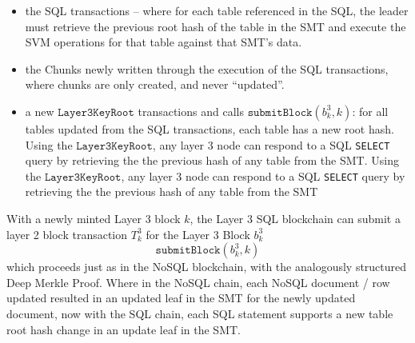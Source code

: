 \documentclass{article}
\newcommand{\blockhash}[2]{b^{#1}_{#2}}
\newcommand{\transaction}[2]{T_{#2}^#1}
\newcommand{\submitblock}[2]{\texttt{submitBlock}(#2, #1)}
\newcommand{\sql}[1]{\texttt{#1}}
\begin{document}
\begin{itemize}
\item the SQL transactions -- where for each table referenced in the SQL, the leader must retrieve the previous root hash of the table in the SMT and execute the SVM operations for that table against that SMT's data.

\item the Chunks newly written through the execution of the SQL transactions, where chunks are only created, and never ``updated''.

\item a  new $\texttt{Layer3KeyRoot}$  transactions and calls $\submitblock{k}{\blockhash{3}{k}}$: for all tables updated from the SQL transactions, each table has a new root hash.
Using the $\texttt{Layer3KeyRoot}$, any layer 3 node can respond to a SQL \sql{SELECT} query by retrieving the the previous hash of any table from the SMT.
Using the $\texttt{Layer3KeyRoot}$, any layer 3 node can respond to a SQL \sql{SELECT} query by retrieving the the previous hash of any table from the SMT

\end{itemize}
With a newly minted Layer 3 block $k$, the Layer 3 SQL blockchain can submit a layer 2 block transaction $\transaction{3}{k}$ for the  Layer 3 Block $\blockhash{3}{k}$
\[
\submitblock{k}{\blockhash{3}{k}}
\]
which proceeds just as in the NoSQL blockchain, with the analogously structured Deep Merkle Proof.  Where in the NoSQL chain, each NoSQL document / row updated resulted in an updated leaf in the SMT for the newly updated document, now with the SQL chain, each SQL statement supports a new table root hash change in an update leaf in the SMT.
\end{document}
